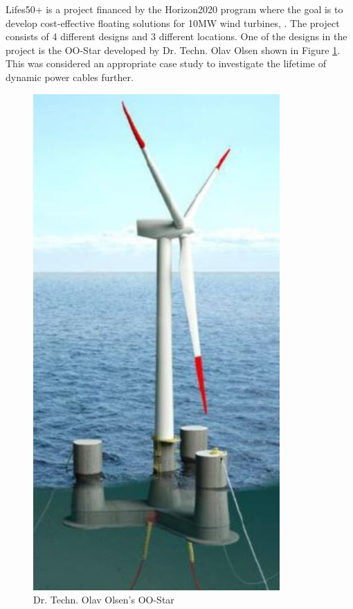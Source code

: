 \newline
\newline
Lifes50+ is a project financed by the Horizon2020 program where the goal is to develop cost-effective floating solutions for 10MW wind turbines, \cite{Horizon2010}. The project consists of 4 different designs and 3 different locations. One of the designs in the project is the OO-Star developed by Dr. Techn. Olav Olsen shown in Figure \ref{fig:oostarintro}. This was considered an appropriate case study to investigate the lifetime of dynamic power cables further.

\begin{figure}[H]
\centering
\includegraphics[scale=0.5]{figures/oostar}
\caption[$\; \:$Dr. Techn. Olav Olsen's OO-Star]{Dr. Techn. Olav Olsen's OO-Star \cite{Lifes50+D4.2} }
 \label{fig:oostarintro}
\end{figure}


